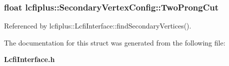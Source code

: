 \subsubsection[{Two\-Prong\-Cut}]{\setlength{\rightskip}{0pt plus 5cm}float lcfiplus\-::\-Secondary\-Vertex\-Config\-::\-Two\-Prong\-Cut}\label{structlcfiplus_1_1SecondaryVertexConfig_a93de9ac2d096836d0ee7a55070c2f68d}


Referenced by lcfiplus\-::\-Lcfi\-Interface\-::find\-Secondary\-Vertices().



The documentation for this struct was generated from the following file\-:\begin{DoxyCompactItemize}
\item 
{\bf Lcfi\-Interface.\-h}\end{DoxyCompactItemize}
